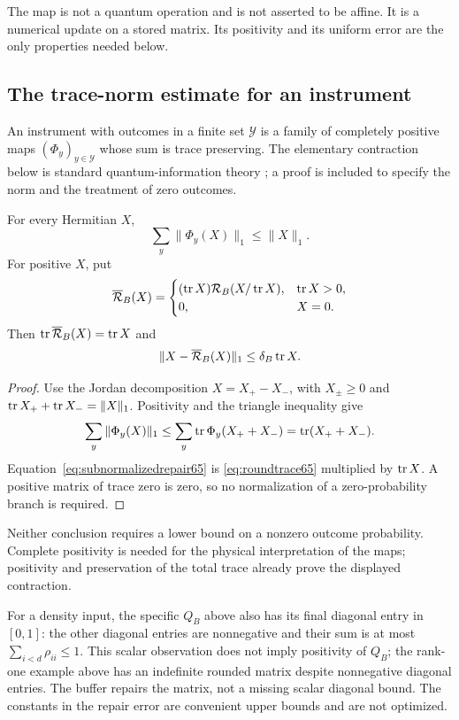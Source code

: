The map is not a quantum operation and is not asserted to be affine.
It is a numerical update on a stored matrix. Its positivity and its
uniform error are the only properties needed below.

\subsection{The trace-norm estimate for an instrument}
An instrument with outcomes in a finite set $\mathcal Y$ is a family
of completely positive maps $(\Phi_y)_{y\in\mathcal Y}$ whose sum is
trace preserving. The elementary contraction below is standard
quantum-information theory \cite[Corollary~3.40]{Watrous65}; a proof is
included to specify the norm and the treatment of zero outcomes.

\begin{lemma}\label{lem:instrumentcontraction65}
For every Hermitian $X$,
\begin{equation}\label{eq:instrumentcontraction65}
                       \sum_y\|\Phi_y(X)\|_1\le\|X\|_1.
\end{equation}
For positive $X$, put
\[
 \overline{\mathcal R}_B(X)=
 \begin{cases}
   (\operatorname{tr} X)\mathcal R_B(X/\operatorname{tr} X),&\operatorname{tr} X>0,\\
   0,&X=0.
 \end{cases}
\]
Then $\operatorname{tr}\overline{\mathcal R}_B(X)=\operatorname{tr} X$ and
\begin{equation}\label{eq:subnormalizedrepair65}
 \|X-\overline{\mathcal R}_B(X)\|_1\le\delta_B\operatorname{tr} X.
\end{equation}
\end{lemma}
\begin{proof}
Use the Jordan decomposition $X=X_+-X_-$, with $X_\pm\ge0$ and
$\operatorname{tr} X_++\operatorname{tr} X_-=\|X\|_1$. Positivity and the triangle inequality give
\[
 \sum_y\|\Phi_y(X)\|_1
 \le\sum_y\operatorname{tr}\Phi_y(X_++X_-)=\operatorname{tr}(X_++X_-).
\]
Equation~\eqref{eq:subnormalizedrepair65} is
\eqref{eq:roundtrace65} multiplied by $\operatorname{tr} X$.
A positive matrix of trace zero is zero, so no normalization of a
zero-probability branch is required.
\end{proof}
Neither conclusion requires a lower bound on a nonzero outcome
probability. Complete positivity is needed for the physical
interpretation of the maps; positivity and preservation of the total
trace already prove the displayed contraction.

\begin{remark}\label{rem:diagonal66}
For a density input, the specific $Q_B$ above also has its final
diagonal entry in $[0,1]$: the other diagonal entries are nonnegative
and their sum is at most $\sum_{i<d}\rho_{ii}\le1$.
This scalar observation does not imply positivity of $Q_B$; the
rank-one example above has an indefinite rounded matrix despite
nonnegative diagonal entries. The buffer repairs the matrix, not a
missing scalar diagonal bound. The constants in the repair error are
convenient upper bounds and are not optimized.
\end{remark}
